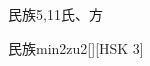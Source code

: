 \begin{entry}{民族}{5,11}{⽒、⽅}
  \begin{phonetics}{民族}{min2zu2}[][HSK 3]
  \end{phonetics}
\end{entry}
